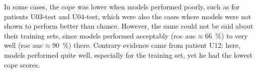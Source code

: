 \begin{table}[!htb]
    \centering
    \caption[Correlation of Prediction Errors]{\gls{cope} between each Patient's Models by Partition}
    \label{tab:copes}
    \setlength{\tabcolsep}{12pt}
    
\end{table}

In some cases, the \gls{cope} was lower when models performed poorly, such as for patients U03-test and U04-test, which were also the cases where models were not shown to perform better than chance.
However, the same could not be said about their training sets, since models performed acceptably (\gls{roc auc}$\approx$\SI{66}{\percent}) to very well (\gls{roc auc}$\approx$\SI{90}{\percent}) there.
Contrary evidence came from patient U12: here, models performed quite well, especially for the training set, yet he had the lowest \gls{cope} scores.

\begin{table}[p]
    \centering
    \caption[Model Evaluation Metrics per Patient and Model]
    {\textbf{Model Evaluation Metrics per Patient and Model}\\
    \textbf{Thresh.}: the optimal threshold, \textbf{EB sens.}: event-based sensitivity. An \enquote{*} next to the \textbf{ROC AUC} indicates a non-significant p-value ($\geq\alpha$) of the Hanley McNeil test.\\
    \textit{All values in percent and rounded}.}
    \label{tab:model_eval_metrics}
    \setlength{\tabcolsep}{4.5pt}
    \renewcommand{\arraystretch}{1.15}
    
\end{table}

\FloatBarrier